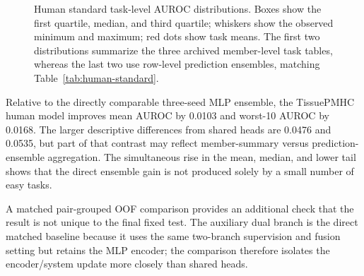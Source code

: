 \begin{figure}[tbp]
\centering
{}
\caption{Human standard task-level AUROC distributions. Boxes show the first quartile, median, and third quartile; whiskers show the observed minimum and maximum; red dots show task means. The first two distributions summarize the three archived member-level task tables, whereas the last two use row-level prediction ensembles, matching Table~\ref{tab:human-standard}.}
\label{fig:human-standard}
\end{figure}

Relative to the directly comparable three-seed MLP ensemble, the TissuePMHC human model improves mean AUROC by 0.0103 and worst-10 AUROC by 0.0168. The larger descriptive differences from shared heads are 0.0476 and 0.0535, but part of that contrast may reflect member-summary versus prediction-ensemble aggregation. The simultaneous rise in the mean, median, and lower tail shows that the direct ensemble gain is not produced solely by a small number of easy tasks.

A matched pair-grouped OOF comparison provides an additional check that the result is not unique to the final fixed test. The auxiliary dual branch is the direct matched baseline because it uses the same two-branch supervision and fusion setting but retains the MLP encoder; the comparison therefore isolates the encoder/system update more closely than shared heads.

